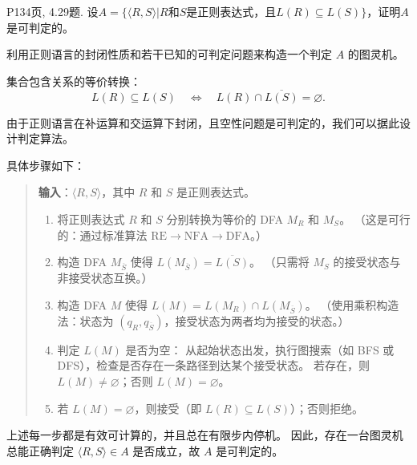 \documentclass[11pt,addpoints,answers]{exam}
\begin{document}
\begin{questions}
	
	\question P134页, 4.29题.
	设$A=\{\langle R,S\rangle |R\text{和}S\text{是正则表达式，且}L(R)\subseteq L(S)\}$，证明$A$是可判定的。
	\begin{solution}
		利用正则语言的封闭性质和若干已知的可判定问题来构造一个判定 $A$ 的图灵机。

        集合包含关系的等价转换：
        \[
        L(R) \subseteq L(S) \quad \Longleftrightarrow \quad L(R) \cap \overline{L(S)} = \varnothing.
        \]
        
        由于正则语言在补运算和交运算下封闭，且空性问题是可判定的，我们可以据此设计判定算法。
        
        具体步骤如下：
        
        \begin{quote}
        \textbf{输入}：$\langle R, S \rangle$，其中 $R$ 和 $S$ 是正则表达式。
        
        \begin{enumerate}
            \item 将正则表达式 $R$ 和 $S$ 分别转换为等价的 DFA $M_R$ 和 $M_S$。  
                  （这是可行的：通过标准算法 $ \text{RE} \to \text{NFA} \to \text{DFA} $。）
        
            \item 构造 DFA $M_{\overline{S}}$ 使得 $L(M_{\overline{S}}) = \overline{L(S)}$。  
                  （只需将 $M_S$ 的接受状态与非接受状态互换。）
        
            \item 构造 DFA $M$ 使得 $L(M) = L(M_R) \cap L(M_{\overline{S}})$。  
                  （使用乘积构造法：状态为 $(q_R, q_{\overline{S}})$，接受状态为两者均为接受的状态。）
        
            \item 判定 $L(M)$ 是否为空：  
                  从起始状态出发，执行图搜索（如 BFS 或 DFS），检查是否存在一条路径到达某个接受状态。  
                  若存在，则 $L(M) \neq \varnothing$；否则 $L(M) = \varnothing$。
        
            \item 若 $L(M) = \varnothing$，则接受（即 $L(R) \subseteq L(S)$）；否则拒绝。
        \end{enumerate}
        \end{quote}
        
        上述每一步都是有效可计算的，并且总在有限步内停机。
        因此，存在一台图灵机总能正确判定 $\langle R, S \rangle \in A$ 是否成立，故 $A$ 是可判定的。
		
	\end{solution}  
	

\end{questions}
\end{document}

